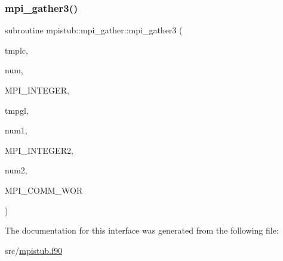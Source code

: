 \mbox{\label{interfacempistub_1_1mpi__gather_a7385d7a064fdd5e01d15695311aaa87e}} 
\subsubsection{\texorpdfstring{mpi\_gather3()}{mpi\_gather3()}}
{\footnotesize\ttfamily subroutine mpistub\+::mpi\+\_\+gather\+::mpi\+\_\+gather3 (\begin{DoxyParamCaption}\item[{integer, dimension(\+:)}]{tmplc,  }\item[{}]{num,  }\item[{}]{M\+P\+I\+\_\+\+I\+N\+T\+E\+G\+ER,  }\item[{integer, dimension(\+:)}]{tmpgl,  }\item[{}]{num1,  }\item[{}]{M\+P\+I\+\_\+\+I\+N\+T\+E\+G\+E\+R2,  }\item[{}]{num2,  }\item[{}]{M\+P\+I\+\_\+\+C\+O\+M\+M\+\_\+\+W\+OR }\end{DoxyParamCaption})}



The documentation for this interface was generated from the following file\+:\begin{DoxyCompactItemize}
\item 
src/\mbox{\hyperlink{mpistub_8f90}{mpistub.\+f90}}\end{DoxyCompactItemize}
